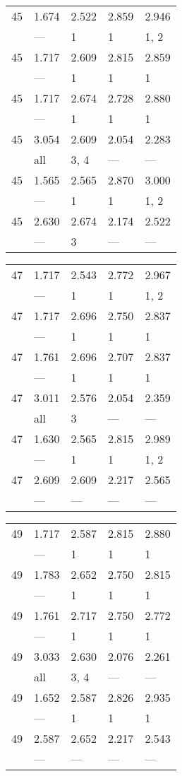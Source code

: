 \begin{tabular}{lllll}
\toprule
 45 & 1.674 & 2.522 & 2.859 & 2.946 \\
    & ---   & 1     & 1     & 1, 2  \\
 45 & 1.717 & 2.609 & 2.815 & 2.859 \\
    & ---   & 1     & 1     & 1     \\
 45 & 1.717 & 2.674 & 2.728 & 2.880 \\
    & ---   & 1     & 1     & 1     \\
 45 & 3.054 & 2.609 & 2.054 & 2.283 \\
    & all   & 3, 4  & ---   & ---   \\
 45 & 1.565 & 2.565 & 2.870 & 3.000 \\
    & ---   & 1     & 1     & 1, 2  \\
 45 & 2.630 & 2.674 & 2.174 & 2.522 \\
    & ---   & 3     & ---   & ---   \\
\bottomrule
\end{tabular}
\begin{tabular}{lllll}
\toprule
 47 & 1.717 & 2.543 & 2.772 & 2.967 \\
    & ---   & 1     & 1     & 1, 2  \\
 47 & 1.717 & 2.696 & 2.750 & 2.837 \\
    & ---   & 1     & 1     & 1     \\
 47 & 1.761 & 2.696 & 2.707 & 2.837 \\
    & ---   & 1     & 1     & 1     \\
 47 & 3.011 & 2.576 & 2.054 & 2.359 \\
    & all   & 3     & ---   & ---   \\
 47 & 1.630 & 2.565 & 2.815 & 2.989 \\
    & ---   & 1     & 1     & 1, 2  \\
 47 & 2.609 & 2.609 & 2.217 & 2.565 \\
    & ---   & ---   & ---   & ---   \\
\bottomrule
\end{tabular}
\begin{tabular}{lllll}
\toprule
 49 & 1.717 & 2.587 & 2.815 & 2.880 \\
    & ---   & 1     & 1     & 1     \\
 49 & 1.783 & 2.652 & 2.750 & 2.815 \\
    & ---   & 1     & 1     & 1     \\
 49 & 1.761 & 2.717 & 2.750 & 2.772 \\
    & ---   & 1     & 1     & 1     \\
 49 & 3.033 & 2.630 & 2.076 & 2.261 \\
    & all   & 3, 4  & ---   & ---   \\
 49 & 1.652 & 2.587 & 2.826 & 2.935 \\
    & ---   & 1     & 1     & 1     \\
 49 & 2.587 & 2.652 & 2.217 & 2.543 \\
    & ---   & ---   & ---   & ---   \\
\bottomrule
\end{tabular}
